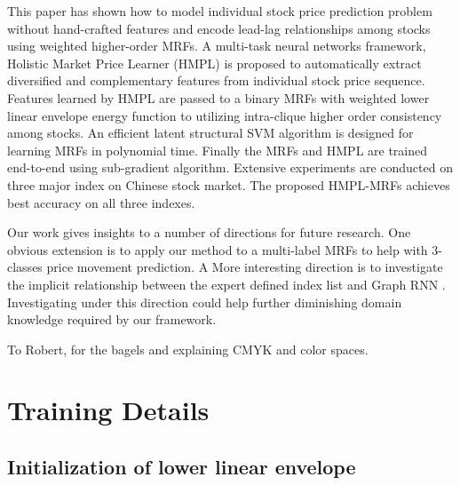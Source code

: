 \documentclass[sigconf]{acmart}
\renewcommand{\cite}{\citep}
\begin{document}
This paper has shown how to model individual stock price
prediction problem without hand-crafted features and encode
lead-lag relationships among stocks using weighted higher-order
MRFs. A multi-task neural networks framework, Holistic Market
Price Learner (HMPL) is proposed to automatically extract
diversified and complementary features from individual stock
price sequence. Features learned by HMPL are passed to a binary
MRFs with weighted lower linear envelope energy function to
utilizing intra-clique higher order consistency among stocks. An
efficient latent structural SVM algorithm is designed for
learning MRFs in polynomial time. Finally the MRFs and HMPL are
trained end-to-end using sub-gradient algorithm. Extensive
experiments are conducted on three major index on Chinese stock
market. The proposed HMPL-MRFs achieves best accuracy on all
three indexes.

Our work gives insights to a number of directions for future
research. One obvious extension is to apply our method to a multi-label
MRFs to help with 3-classes price movement prediction. A More interesting direction is to investigate the implicit relationship between the expert defined index list and Graph RNN \cite{you2018graphrnn}. Investigating under this direction could help further diminishing domain knowledge required by our framework.

\begin{acks}
To Robert, for the bagels and explaining CMYK and color spaces.
\end{acks}




\newpage
\appendix

\section{Training Details}
\label{sec:train_detail}

\subsection{Initialization of lower linear envelope}
\label{sec:sup_init}
\end{document}
